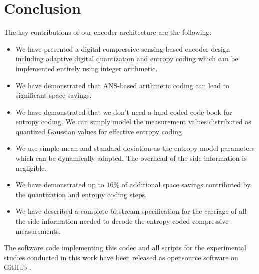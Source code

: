 \section{Conclusion}
\label{sec:conclusion}

The key contributions of our encoder architecture are the following:

\begin{itemize}
    \item We have presented a digital compressive sensing-based encoder
    design including adaptive digital quantization
    and entropy coding which can be
    implemented entirely using integer arithmetic.
    \item We have demonstrated that ANS-based arithmetic coding can
    lead to significant space savings.
    \item We have demonstrated that we don't need a hard-coded
    code-book for entropy coding. We can simply model the
    measurement values distributed as quantized Gaussian values
    for effective entropy coding.
    \item We use simple mean and standard deviation as the entropy model
    parameters which can be dynamically adapted. The overhead of
    the side information is negligible.
    \item We have demonstrated up to $16\%$ of additional space
    savings contributed by the quantization and entropy coding steps.
    \item We have described a complete bitstream specification for
    the carriage of all the side information needed to decode the
    entropy-coded compressive measurements.
\end{itemize}

The software code implementing this codec
and all scripts for the experimental studies conducted
in this work have been released as opensource software
on GitHub \cite{kumar2022ecgcodec}.



